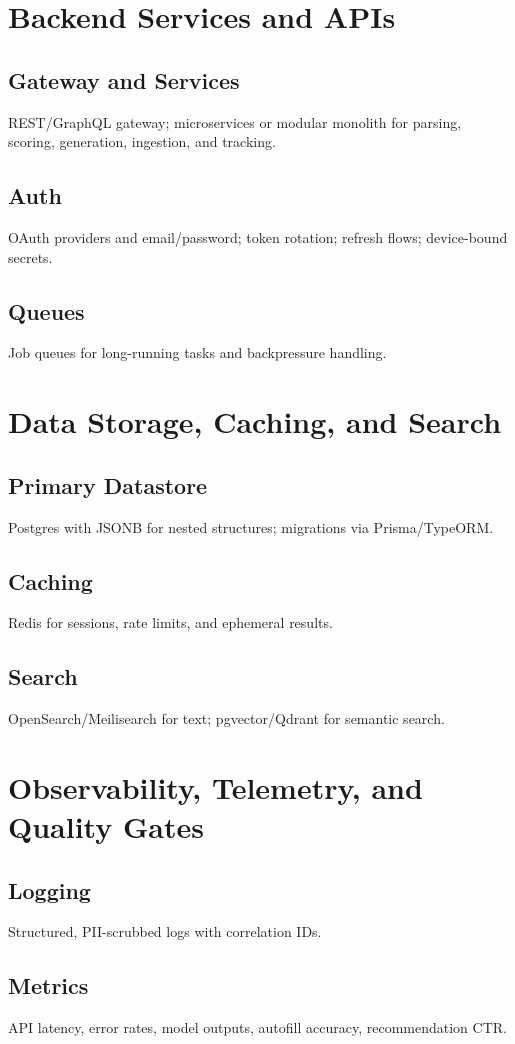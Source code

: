 \documentclass[12pt,a4paper]{article}
\begin{document}
\section{Backend Services and APIs}
\subsection{Gateway and Services}
REST/GraphQL gateway; microservices or modular monolith for parsing, scoring, generation, ingestion, and tracking.
\subsection{Auth}
OAuth providers and email/password; token rotation; refresh flows; device-bound secrets.
\subsection{Queues}
Job queues for long-running tasks and backpressure handling.

\section{Data Storage, Caching, and Search}
\subsection{Primary Datastore}
Postgres with JSONB for nested structures; migrations via Prisma/TypeORM.
\subsection{Caching}
Redis for sessions, rate limits, and ephemeral results.
\subsection{Search}
OpenSearch/Meilisearch for text; pgvector/Qdrant for semantic search.

\section{Observability, Telemetry, and Quality Gates}
\subsection{Logging}
Structured, PII-scrubbed logs with correlation IDs.
\subsection{Metrics}
API latency, error rates, model outputs, autofill accuracy, recommendation CTR.
\end{document}

